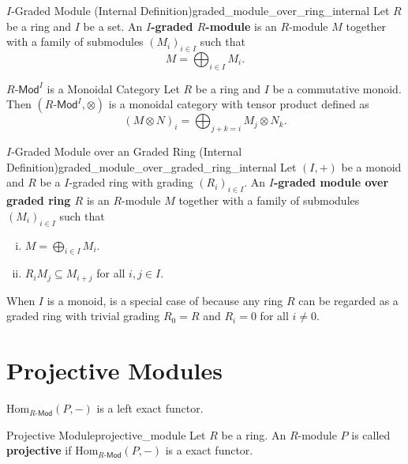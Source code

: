 \begin{definition}{$I$-Graded Module (Internal Definition)}{graded_module_over_ring_internal}
    Let $R$ be a ring and $I$ be a set. An \textbf{$I$-graded $R$-module} is an $R$-module $M$ together with a family of submodules $\left(M_i\right)_{i\in I}$ such that
    \[
        M=\bigoplus_{i\in I}M_i.
    \]
\end{definition}

\begin{proposition}{$R\text{-}\mathsf{Mod}^I$ is a Monoidal Category}{}
    Let $R$ be a ring and $I$ be a commutative monoid. Then $\left(R\text{-}\mathsf{Mod}^I,\otimes\right)$ is a monoidal category with tensor product defined as
    \[
        \left(M\otimes N\right)_i=\bigoplus_{j+k=i}M_j\otimes N_k.
    \]
\end{proposition}



\begin{definition}{$I$-Graded Module over an Graded Ring (Internal Definition)}{graded_module_over_graded_ring_internal}
    Let $(I,+)$ be a monoid and $R$ be a $I$-graded ring with grading $(R_i)_{i\in I}$. An \textbf{$I$-graded module over graded ring $R$} is an $R$-module $M$ together with a family of submodules $\left(M_i\right)_{i\in I}$ such that
    \begin{enumerate}[(i)]
        \item $M=\bigoplus_{i\in I}M_i$.
        \item $R_iM_j\subseteq M_{i+j}$ for all $i, j\in I$.
    \end{enumerate}
\end{definition}

When $I$ is a monoid,  is a special case of  because any ring $R$ can be regarded as a graded ring with trivial grading $R_0=R$ and $R_i=0$ for all $i\ne0$.


\section{Projective Modules}
$\mathrm{Hom}_{R\text{-}\mathsf{Mod}}\left(P, -\right)$ is a left exact functor.
\begin{definition}{Projective Module}{projective_module}
    Let $R$ be a ring. An $R$-module $P$ is called \textbf{projective} if $\mathrm{Hom}_{R\text{-}\mathsf{Mod}}\left(P, -\right)$ is a exact functor.
\end{definition}

